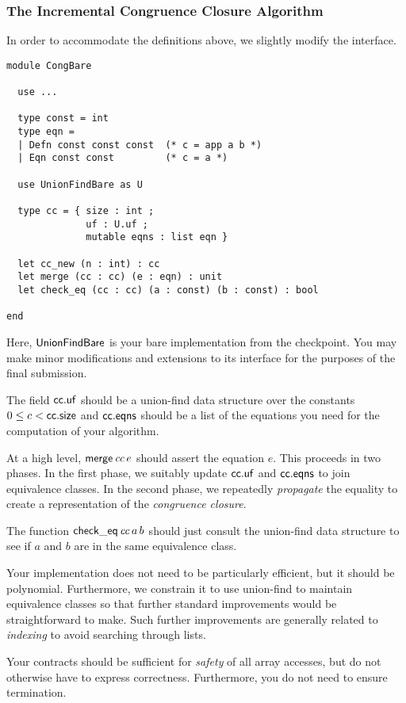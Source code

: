 \documentclass[11pt]{article}
\begin{document}
\subsubsection{The Incremental Congruence Closure Algorithm}

In order to accommodate the definitions above, we slightly
modify the interface.
\begin{lstlisting}
module CongBare

  use ...

  type const = int
  type eqn =
  | Defn const const const  (* c = app a b *)
  | Eqn const const         (* c = a *)

  use UnionFindBare as U

  type cc = { size : int ;
              uf : U.uf ;
              mutable eqns : list eqn }

  let cc_new (n : int) : cc
  let merge (cc : cc) (e : eqn) : unit
  let check_eq (cc : cc) (a : const) (b : const) : bool

end
\end{lstlisting}
Here, $\mathsf{UnionFindBare}$ is your bare implementation from the
checkpoint.  You may make minor modifications and extensions to its
interface for the purposes of the final submission.

The field $\mathsf{cc.uf}$ should be a union-find data structure over the
constants $0 \leq c < \mathsf{cc.size}$ and $\mathsf{cc.eqns}$ should be a list of
the equations you need for the computation of your algorithm.

At a high level, $\mathsf{merge}\, \mathit{cc}\, e$ should assert the equation
$e$.  This proceeds in two phases.  In the first phase, we suitably
update $\mathsf{cc.uf}$ and $\mathsf{cc.eqns}$ to join equivalence classes.  In
the second phase, we repeatedly \emph{propagate} the equality to create a
representation of the \emph{congruence closure}.

The function $\mathsf{check\_eq}\, \mathit{cc}\, a\, b$ should just consult
the union-find data structure to see if $a$ and $b$ are in the same
equivalence class.

Your implementation does not need to be particularly efficient, but it
should be polynomial.  Furthermore, we constrain it to use union-find
to maintain equivalence classes so that further standard improvements
would be straightforward to make.  Such further improvements are
generally related to \emph{indexing} to avoid searching through lists.

Your contracts should be sufficient for \emph{safety} of all array
accesses, but do not otherwise have to express correctness.
Furthermore, you do not need to ensure termination.
\end{document}
